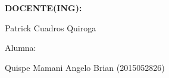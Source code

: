 \documentclass[12pt,letterpaper]{article}
\begin{document}
\begin{titlepage}
\begin{center}
\vspace*{0.3in}
\begin{Large}
\textbf{DOCENTE(ING):} \\
\end{Large}

\vspace*{0.1in}
\begin{large}
 Patrick Cuadros Quiroga\\
\end{large}

\vspace*{0.2in}
\vspace*{0.1in}
\begin{large}
Alumna: \\
\begin{flushleft}
Quispe Mamani Angelo Brian		\hfill	(2015052826) \\
\end{flushleft}
\end{large}
\end{center}

\end{titlepage}


\tableofcontents %
\thispagestyle{empty} %
\newpage
\setcounter{page}{1} %
\end{document}

